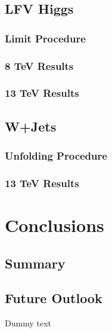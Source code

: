 \documentclass{article}
\begin{document}
\subsection{LFV Higgs}
\subsubsection{Limit Procedure}
\subsubsection{8 TeV Results}
\subsubsection{13 TeV Results}
\subsection{W+Jets}
\subsubsection{Unfolding Procedure}
\subsubsection{13 TeV Results}

\section{Conclusions}
\subsection{Summary}
\subsection{Future Outlook}








Dummy text
\end{document}
